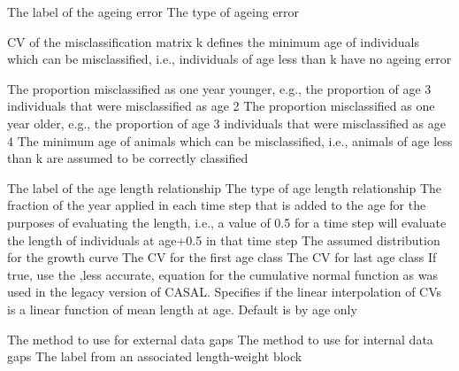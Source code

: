  {The label of the ageing error}
 {The type of ageing error}
\par\textbf{}\par
\par\textbf{}\par
\par\textbf{}\par
{} {CV of the misclassification matrix}
 {k defines the minimum age of individuals which can be misclassified, i.e., individuals of age less than k have no ageing error}
\par\textbf{}\par
{} {The proportion misclassified as one year younger, e.g., the proportion of age 3 individuals that were misclassified as age 2}
 {The proportion misclassified as one year older, e.g., the proportion of age 3 individuals that were misclassified as age 4}
 {The minimum age of animals which can be misclassified, i.e., animals of age less than k are assumed to be correctly classified}
\par\par
{} {The label of the age length relationship}
 {The type of age length relationship}
 {The fraction of the year applied in each time step that is added to the age for the purposes of evaluating the length, i.e., a value of 0.5 for a time step will evaluate the length of individuals at age+0.5 in that time step}
 {The assumed distribution for the growth curve}
 {The CV for the first age class}
 {The CV for last age class}
 {If true, use the ,less accurate, equation for the cumulative normal function as was used in the legacy version of CASAL.}
 {Specifies if the linear interpolation of CVs is a linear function of mean length at age. Default is by age only}
\par\textbf{}\par
{} {The method to use for external data gaps}
 {The method to use for internal data gaps}
 {The label from an associated length-weight block}
